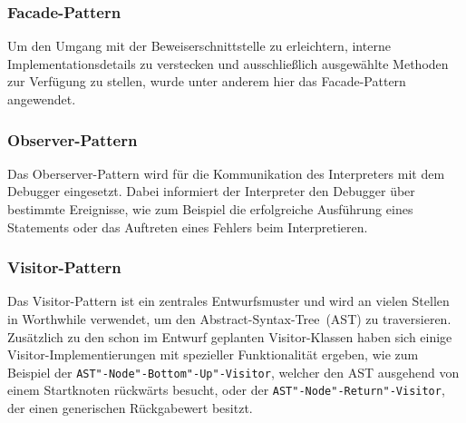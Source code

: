 \subsubsection{Facade-Pattern}
Um den Umgang mit der Beweiserschnittstelle zu erleichtern, interne Implementationsdetails zu verstecken und ausschließlich ausgewählte Methoden zur Verfügung zu stellen, wurde unter anderem hier das Facade-Pattern angewendet.

\subsubsection{Observer-Pattern}
Das Oberserver-Pattern wird für die Kommunikation des Interpreters mit dem Debugger eingesetzt. Dabei informiert der Interpreter den Debugger über bestimmte Ereignisse, wie zum Beispiel die erfolgreiche Ausführung eines Statements oder das Auftreten eines Fehlers beim Interpretieren.

\subsubsection{Visitor-Pattern}
Das Visitor-Pattern ist ein zentrales Entwurfsmuster und wird an vielen Stellen in Worthwhile verwendet, um den Abstract-Syntax-Tree~(AST) zu traversieren. Zusätzlich zu den schon im Entwurf geplanten Visitor-Klassen haben sich einige Visitor-Implementierungen mit spezieller Funktionalität ergeben, wie zum Beispiel der \texttt{AST"-Node"-Bottom"-Up"-Visitor}, welcher den AST ausgehend von einem Startknoten rückwärts besucht, oder der \texttt{AST"-Node"-Return"-Visitor}, der einen generischen Rückgabewert besitzt.

